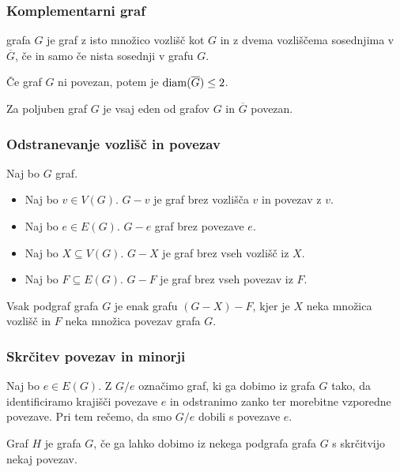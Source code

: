 \subsubsection*{Komplementarni graf}
\begin{definicija}
     grafa $G$ je graf z isto množico vozlišč kot $G$ in z dvema vozliščema sosednjima v $\overline{G}$, če in samo če nista sosednji v grafu $G$.
\end{definicija}

\begin{trditev}
    Če graf $G$ ni povezan, potem je $\operatorname{diam}(\overline{G}) \leq 2$.
\end{trditev}

\begin{posledica}
    Za poljuben graf $G$ je vsaj eden od grafov $G$ in $\overline{G}$ povezan.
\end{posledica}

\subsubsection*{Odstranevanje vozlišč in povezav}
Naj bo $G$ graf.
\begin{itemize}
    \item Naj bo $v \in V(G)$. $G - v$ je graf brez vozlišča $v$ in povezav z $v$.
    \item Naj bo $e \in E(G)$. $G - e$ graf brez povezave $e$.
    \item Naj bo $X \subseteq V(G)$. $G - X$ je graf brez vseh vozlišč iz $X$.
    \item Naj bo $F \subseteq E(G)$. $G-F$ je graf brez vseh povezav iz $F$.
\end{itemize}

\begin{opomba}
    Vsak podgraf grafa $G$ je enak grafu $(G-X)-F$, kjer je $X$ neka množica vozlišč in $F$ neka množica povezav grafa $G$.
\end{opomba}

\subsubsection*{Skrčitev povezav in minorji}
Naj bo $e \in E(G)$. Z $G/e$ označimo graf, ki ga dobimo iz grafa $G$ tako, da identificiramo krajišči povezave $e$ in odstranimo zanko ter morebitne vzporedne povezave. Pri tem rečemo, da smo $G / e$ dobili s  povezave $e$.

\begin{definicija}
    Graf $H$ je  grafa $G$, če ga lahko dobimo iz nekega podgrafa grafa $G$ s skrčitvijo nekaj povezav.
\end{definicija}

